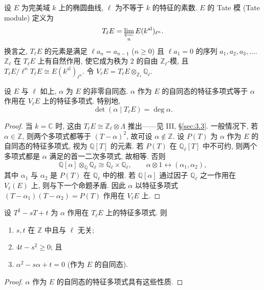 \label{pg:tate-module}设 $E$ 为完美域 $k$ 上的椭圆曲线, $\ell$ 为不等于 $k$ 的特征的素数. $E$ 的 Tate 模 (Tate module) 定义为
\[
T_\ell E = \varprojlim_n E(k^{\mathrm{al}})_{\ell^n}.
\]
换言之, $T_\ell E$ 的元素是满足 $\ell a_n = a_{n-1}$ ($n\ge 0$) 且 $\ell a_1 = 0$ 的序列 $a_1, a_2, a_3, \dots$. $\mathbb{Z}_\ell$ 在 $T_\ell E$ 上有自然作用, 使它成为秩为 $2$ 的自由 $\mathbb{Z}_\ell$-模, 且 $T_\ell E/\ell^nT_\ell E\cong E(k^{\mathrm{al}})_{\ell^n}$. 令 $V_\ell E = T_\ell E\otimes_{\mathbb{Z}_\ell}\mathbb{Q}_\ell$.

\begin{proposition} \label{thm:2.6.4} 
设 $E$ 与 $\ell$ 如上, $\alpha$ 为 $E$ 的非零自同态. $\alpha$ 作为 $E$ 的自同态的特征多项式等于 $\alpha$ 作用在 $V_\ell E$ 上的特征多项式. 特别地,
\[
\det(\alpha\mid T_\ell E) = \deg\alpha.
\]
\end{proposition}

\begin{proof}
当 $k = \mathbb{C}$ 时, 这由 $T_\ell E\cong\mathbb{Z}_\ell\otimes\Lambda$ 推出——见 III, \S\ref{sec:3.3}. 一般情况下, 若 $\alpha\in\mathbb{Z}$, 则两个多项式都等于 $(T-\alpha)^2$, 故可设 $\alpha\notin\mathbb{Z}$. 设 $P(T)$ 为 $\alpha$ 作为 $E$ 的自同态的特征多项式, 视为 $\mathbb{Q}[T]$ 的元素. 若 $P(T)$ 在 $\mathbb{Q}_\ell[T]$ 中不可约, 则两个多项式都是 $\alpha$ 满足的首一二次多项式, 故相等. 否则
\[
\mathbb{Q}[\alpha]\otimes_{\mathbb{Q}}\mathbb{Q}_\ell\cong\mathbb{Q}_\ell\times\mathbb{Q}_\ell, \qquad
\alpha\otimes 1\leftrightarrow(\alpha_1, \alpha_2),
\]
其中 $\alpha_1$ 与 $\alpha_2$ 是 $P(T)$ 在 $\mathbb{Q}_\ell$ 中的根. 若 $\mathbb{Q}[\alpha]$ 通过因子 $\mathbb{Q}_\ell$ 之一作用在 $V_\ell(E)$ 上, 则与下一个命题矛盾. 因此 $\alpha$ 以特征多项式 $(T-\alpha_1)(T-\alpha_2) = P(T)$ 作用在 $V_\ell E$ 上.
\end{proof}

\begin{corollary} \label{thm:2.6.5} 
设 $T^2 - sT + t$ 为 $\alpha$ 作用在 $T_\ell E$ 上的特征多项式. 则
\begin{enumerate}[label=\textup{(\alph*)}]
\item $s, t$ 在 $\mathbb{Z}$ 中且与 $\ell$ 无关;
\item $4t - s^2\ge 0$; 且
\item $\alpha^2 - s\alpha + t = 0$ (作为 $E$ 的自同态).
\end{enumerate}
\end{corollary}

\begin{proof}
$\alpha$ 作为 $E$ 的自同态的特征多项式具有这些性质.
\end{proof}

